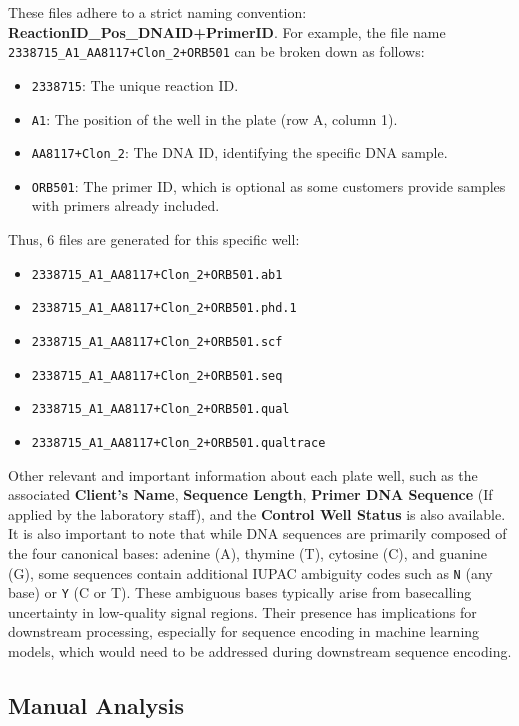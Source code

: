 These files adhere to a strict naming convention: \textbf{ReactionID\_Pos\_DNAID+PrimerID}. 
For example, the file name \texttt{2338715\_A1\_AA8117+Clon\_2+ORB501} can be broken down as follows:
\begin{itemize}
  \item \texttt{2338715}: The unique reaction ID.
  \item \texttt{A1}: The position of the well in the plate (row A, column 1).
  \item \texttt{AA8117+Clon\_2}: The DNA ID, identifying the specific DNA sample.
  \item \texttt{ORB501}: The primer ID, which is optional as some customers provide samples with primers already included.
\end{itemize}
Thus, 6 files are generated for this specific well: 
\begin{itemize}
  \item \texttt{2338715\_A1\_AA8117+Clon\_2+ORB501.ab1}
  \item \texttt{2338715\_A1\_AA8117+Clon\_2+ORB501.phd.1}
  \item \texttt{2338715\_A1\_AA8117+Clon\_2+ORB501.scf}
  \item \texttt{2338715\_A1\_AA8117+Clon\_2+ORB501.seq}
  \item \texttt{2338715\_A1\_AA8117+Clon\_2+ORB501.qual}
  \item \texttt{2338715\_A1\_AA8117+Clon\_2+ORB501.qualtrace}
\end{itemize}

Other relevant and important information about each plate well, such as the associated \textbf{Client's Name}, \textbf{Sequence Length}, \textbf{Primer DNA Sequence} (If applied by the laboratory staff), and the \textbf{Control Well Status} is also available.  
\newline
It is also important to note that while DNA sequences are primarily composed of the four canonical bases: adenine (A), thymine (T), cytosine (C), and guanine (G), some sequences contain additional IUPAC ambiguity codes such as \texttt{N} (any base) or \texttt{Y} (C or T). These ambiguous bases typically arise from basecalling uncertainty in low-quality signal regions. Their presence has implications for downstream processing, especially for sequence encoding in machine learning models, which would need to be addressed during downstream sequence encoding.
\newline
\subsection{Manual Analysis}

